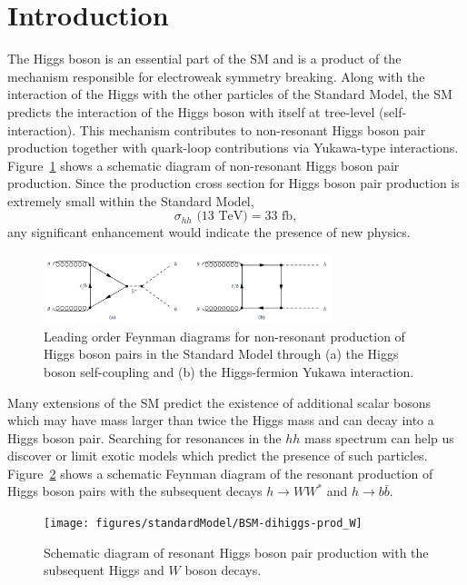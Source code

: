 \section{Introduction}
\label{sec:intro}
The Higgs boson is an essential part of the SM and is a product of the mechanism responsible for electroweak symmetry breaking. Along with the interaction of the Higgs with the other particles of the Standard Model, the SM predicts the interaction of the Higgs boson with itself at tree-level (self-interaction). This mechanism contributes to non-resonant Higgs boson pair production together with quark-loop contributions via Yukawa-type interactions. Figure~\ref{fig:nr_hh_production} shows a schematic diagram of non-resonant Higgs boson pair production. Since the production cross section for Higgs boson pair production is extremely small within the Standard Model, 
\begin{equation*}
\sigma_{hh}\text{ (13 TeV)} = 33 \text{ fb},
\end{equation*}
any significant enhancement would indicate the presence of new physics.

\begin{figure}[!h] 
\begin{center}
\includegraphics*[width=0.75\textwidth] {chapters/dihiggs2/figures/nr-diHiggs-production.png}
\caption{Leading order Feynman diagrams for non-resonant production of Higgs
  boson pairs in the Standard Model through (a) the Higgs boson self-coupling
  and (b) the Higgs-fermion Yukawa interaction.} 
  \label{fig:nr_hh_production}
\end{center}
\end{figure}

Many extensions of the SM predict the existence of additional scalar bosons which may have mass larger than twice the Higgs mass and can decay into a Higgs boson pair. Searching for resonances in the $hh$ mass spectrum can help us discover or limit exotic models which predict the presence of such particles. Figure~\ref{fig:resonant_hh_production} shows a schematic Feynman diagram of the resonant production of Higgs boson pairs with the subsequent decays $h \to WW^{\ast}$ and $h \to b \bar{b}$.


\begin{figure}[!h] 
\begin{center}
\texttt{[image: figures/standardModel/BSM-dihiggs-prod\_W]}
  \caption{Schematic diagram of resonant Higgs boson pair production with the
    subsequent Higgs and $W$ boson decays.}
  \label{fig:resonant_hh_production}
\end{center}
\end{figure}


